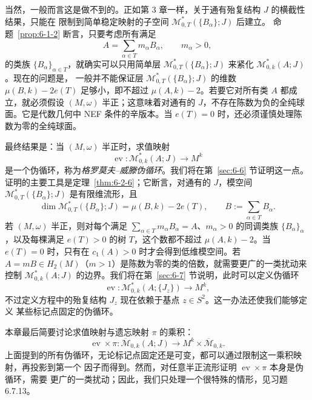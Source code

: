 当然，一般而言这是做不到的。正如第 3 章一样，关于通有殆复结构 $J$ 的横截性结果，只能在
限制到简单稳定映射的子空间 $\mathcal M^*_{0,T}(\{B_\alpha\};J)$ 后建立。
命题~\ref{prop:6-1-2} 断言，只要考虑所有满足
\[
  A=\sum_{\alpha\in T}m_\alpha B_\alpha,
  \qquad m_\alpha>0,
\]
的类族 $\{B_\alpha\}_{\alpha\in T}$，就确实可以只用简单层
$\mathcal M^*_{0,T}(\{B_\alpha\};J)$ 来紧化 $\mathcal M^*_{0,k}(A;J)$。现在的问题是，
一般并不能保证层 $\mathcal M^*_{0,T}(\{B_\alpha\};J)$ 的维数
$\mu(B,k)-2e(T)$ 足够小，即不超过 $\mu(A,k)-2$。若要它对所有类 $A$ 都成立，就必须假设
$(M,\omega)$ 半正；这意味着对通有的 $J$，不存在陈数为负的全纯球面。它是代数几何中
NEF 条件的辛版本。当 $e(T)=0$ 时，还必须谨慎处理陈数为零的全纯球面。

最终结果是：当 $(M,\omega)$ 半正时，求值映射
\[
  \operatorname{ev}:\mathcal M^*_{0,k}(A;J)\longrightarrow M^k
\]
是一个伪循环，称为\emph{格罗莫夫--威滕伪循环}。我们将在第~\ref{sec:6-6} 节证明这一点。
证明的主要工具是定理~\ref{thm:6-2-6}；它断言，对通有的 $J$，模空间
$\mathcal M^*_{0,T}(\{B_\alpha\};J)$ 是有限维流形，且
\[
  \dim\mathcal M^*_{0,T}(\{B_\alpha\};J)
  =\mu(B,k)-2e(T),
  \qquad B:=\sum_{\alpha\in T}B_\alpha.
\]
若 $(M,\omega)$ 半正，则对每个满足
$\sum_{\alpha\in T}m_\alpha B_\alpha=A$、$m_\alpha>0$ 的同调类族
$\{B_\alpha\}_\alpha$，以及每棵满足 $e(T)>0$ 的树 $T$，这个数都不超过
$\mu(A,k)-2$。当 $e(T)=0$ 时，只有在 $c_1(A)>0$ 时才会得到低维模空间。若
$A=mB\in H_2(M)$（$m>1$）是陈数为零的类的倍数，就需要更广的一类扰动来控制
$\mathcal M^*_{0,k}(A;J)$ 的边界。我们将在第~\ref{sec:6-7} 节说明，此时可以定义伪循环
\[
  \operatorname{ev}:\mathcal M^*_{0,k}(A;\{J_z\})\longrightarrow M^k,
\]
不过定义方程中的殆复结构 $J_z$ 现在依赖于基点 $z\in S^2$。这一办法还使我们能够定义
某些标记点固定的伪循环。

本章最后简要讨论求值映射与遗忘映射 $\pi$ 的乘积：
\[
  \operatorname{ev}\times\pi:
  \overline{\mathcal M}_{0,k}(A;J)\longrightarrow M^k\times\overline{\mathcal M}_{0,k}.
\]
上面提到的所有伪循环，无论标记点固定还是可变，都可以通过限制这一乘积映射，再投影到第一个
因子而得到。然而，对任意半正流形证明 $\operatorname{ev}\times\pi$ 本身是伪循环，需要
更广的一类扰动；因此，我们只处理一个很特殊的情形，见习题 6.7.13。

